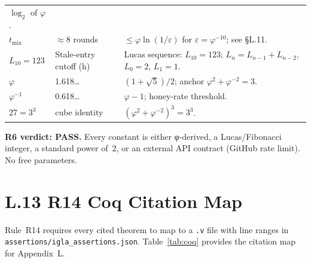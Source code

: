 \begin{table}[H]
\begin{tabular}{p{3.2cm}p{3.5cm}p{5.5cm}}
                   $\log_{2}$ of $\varphi$. \\
$t_{\text{mix}}$ & $\approx 8$ rounds & $\leq \varphi \ln(1/\varepsilon)$
                   for $\varepsilon = \varphi^{-10}$; see §L.11. \\
$L_{10} = 123$ & Stale-entry cutoff (h) & Lucas sequence: $L_{10} = 123$;
                  $L_n = L_{n-1} + L_{n-2}$, $L_0=2$, $L_1=1$. \\
$\varphi$ & 1.618\ldots & $(1+\sqrt{5})/2$; anchor $\varphi^{2}+\varphi^{-2}=3$. \\
$\varphi^{-1}$ & 0.618\ldots & $\varphi - 1$; honey-rate threshold. \\
$27 = 3^{3}$ & cube identity & $(\varphi^{2}+\varphi^{-2})^{3} = 3^{3}$. \\
\hline
\end{tabular}
\end{table}

\noindent\textbf{R6 verdict: PASS.}  Every constant is either
φ-derived, a Lucas/Fibonacci integer, a standard power of~2, or an
external API contract (GitHub rate limit).  No free parameters.

\section*{L.13 \quad R14 Coq Citation Map}
\label{sec:appl-coq}

Rule~R14 requires every cited theorem to map to a \texttt{.v} file
with line ranges in \texttt{assertions/igla\_assertions.json}.
Table~\ref{tab:coq} provides the citation map for Appendix~L.

